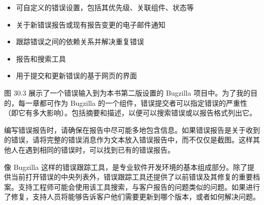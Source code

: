 \begin{itemize}
\item
可自定义的错误设置，包括其优先级、关联组件、状态等

\item
关于新错误报告或现有报告变更的电子邮件通知

\item
跟踪错误之间的依赖关系并解决重复错误

\item
报告和搜索工具

\item
用于提交和更新错误的基于网页的界面
\end{itemize}

图 30.3 展示了一个错误输入到为本书第二版设置的 Bugzilla 项目中。为了我的目的，每一章都可作为 Bugzilla 的一个组件，错误提交者可以指定错误的严重性（即它有多大影响）。包括摘要和描述，以便可以搜索错误或以报告格式列出它。


编写错误报告时，请确保在报告中尽可能多地包含信息。如果错误报告是关于收到的错误，请将完整的错误消息作为文本放入错误报告中，而不仅仅是截图。这样其他人在遇到相同的错误时，可以找到已有的错误报告。

像 Bugzilla 这样的错误跟踪工具，是专业软件开发环境的基本组成部分。除了提供当前打开错误的中央列表外，错误跟踪工具还提供了以前错误及其修复的重要档案。支持工程师可能会使用该工具搜索，与客户报告的问题类似的问题。如果进行了修复，支持人员将能够告诉客户他们需要更新到哪个版本，或者如何解决问题。














